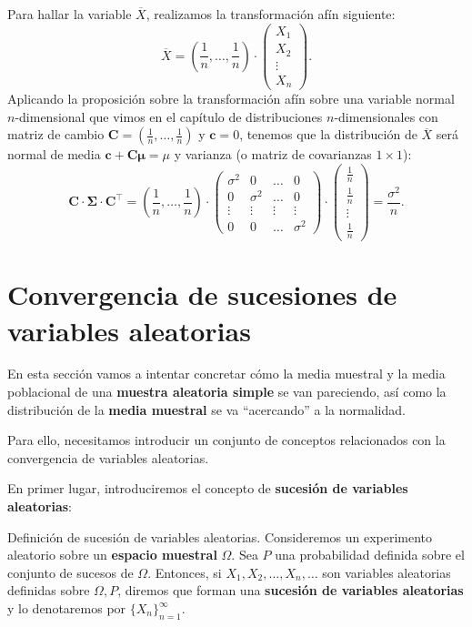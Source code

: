 \documentclass[]{book}
\begin{document}
Para hallar la variable \(\overline{X}\), realizamos la transformación afín siguiente:
\[
\overline{X}=\left(\frac{1}{n},\ldots,\frac{1}{n}\right)\cdot\begin{pmatrix} X_1 \\ X_2\\\vdots \\ X_n \end{pmatrix}.
\]
Aplicando la proposición sobre la transformación afín sobre una variable normal \(n\)-dimensional que vimos en el capítulo de distribuciones \(n\)-dimensionales con matriz de cambio \(\mathbf{C}=\left(\frac{1}{n},\ldots,\frac{1}{n}\right)\) y \(\mathbf{c}=0\), tenemos que la distribución de \(\overline{X}\) será normal de media \(\mathbf{c}+\mathbf{C}\mathbf{\mu} = \mu\) y varianza (o matriz de covarianzas \(1\times 1\)):
\[
\mathbf{C}\cdot\mathbf{\Sigma}\cdot\mathbf{C}^\top =\left(\frac{1}{n},\ldots,\frac{1}{n}\right)\cdot\begin{pmatrix}
\sigma^2 & 0 & \ldots & 0 \\
0 & \sigma^2 & \ldots & 0 \\
\vdots & \vdots & \vdots & \vdots \\
0 & 0 & \ldots & \sigma^2
\end{pmatrix}\cdot \begin{pmatrix}\frac{1}{n}\\\frac{1}{n}\\\vdots\\\frac{1}{n}\end{pmatrix} =\frac{\sigma^2}{n}.
\]

\hypertarget{convergencia-de-sucesiones-de-variables-aleatorias}{%
\section{Convergencia de sucesiones de variables aleatorias}\label{convergencia-de-sucesiones-de-variables-aleatorias}}

En esta sección vamos a intentar concretar cómo la media muestral y la media poblacional de una \textbf{muestra aleatoria simple} se van pareciendo, así como la distribución de la \textbf{media muestral} se va ``acercando'' a la normalidad.

Para ello, necesitamos introducir un conjunto de conceptos relacionados con la convergencia de variables aleatorias.

En primer lugar, introduciremos el concepto de \textbf{sucesión de variables aleatorias}:

Definición de sucesión de variables aleatorias.
Consideremos un experimento aleatorio sobre un \textbf{espacio muestral} \(\Omega\). Sea \(P\) una probabilidad definida sobre el conjunto de sucesos de \(\Omega\). Entonces, si \(X_1,X_2,\ldots,X_n,\ldots\) son variables aleatorias definidas sobre \(\Omega,P\), diremos que forman una \textbf{sucesión de variables aleatorias} y lo denotaremos por \(\{X_n\}_{n=1}^\infty\).
\end{document}

